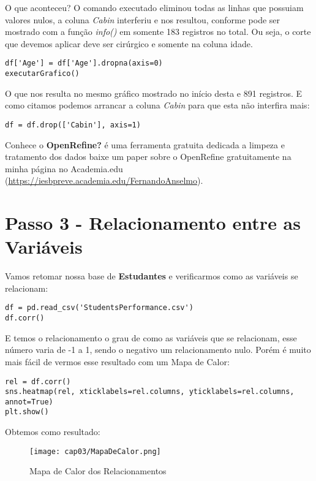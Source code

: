 O que aconteceu? O comando executado eliminou todas as linhas que possuiam valores nulos, a coluna \textit{Cabin} interferiu e nos resultou, conforme pode ser mostrado com a função \textit{info()} em somente 183 registros no total. Ou seja, o corte que devemos aplicar deve ser cirúrgico e somente na coluna idade.
\begin{lstlisting}
df['Age'] = df['Age'].dropna(axis=0)
executarGrafico()
\end{lstlisting}

O que nos resulta no mesmo gráfico mostrado no início desta e 891 registros. E como citamos podemos arrancar a coluna \textit{Cabin} para que esta não interfira mais:
\begin{lstlisting}
df = df.drop(['Cabin'], axis=1)
\end{lstlisting}

\begin{note} 
	Conhece o \textbf{OpenRefine?} é uma ferramenta gratuita dedicada a limpeza e tratamento dos dados baixe um paper sobre o OpenRefine gratuitamente na minha página no Academia.edu (\url{https://iesbpreve.academia.edu/FernandoAnselmo}).
\end{note}

\section{Passo 3 - Relacionamento entre as Variáveis}
Vamos retomar nossa base de \textbf{Estudantes} e verificarmos como as variáveis se relacionam:
\begin{lstlisting}
df = pd.read_csv('StudentsPerformance.csv')
df.corr()
\end{lstlisting}

E temos o relacionamento o grau de como as variáveis que se relacionam, esse número varia de -1 a 1, sendo o negativo um relacionamento nulo. Porém é muito mais fácil de vermos esse resultado com um Mapa de Calor:
\begin{lstlisting}
rel = df.corr()
sns.heatmap(rel, xticklabels=rel.columns, yticklabels=rel.columns, annot=True)
plt.show()
\end{lstlisting}

Obtemos como resultado:
\begin{figure}[H]
	\centering
	\texttt{[image: cap03/MapaDeCalor.png]}
	\caption{Mapa de Calor dos Relacionamentos}
\end{figure}

